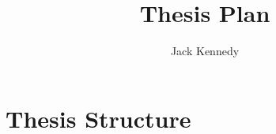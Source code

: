 \documentclass[12pt]{article}
\begin{document}


\title{Thesis Plan}%
\author{Jack Kennedy} %

\maketitle

\section{Thesis Structure}
\end{document}
